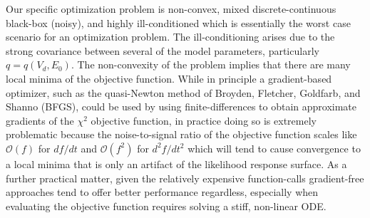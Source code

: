 \documentclass[12pt,a4paper,oneside]{book}
\begin{document}
Our specific optimization problem is non-convex, mixed discrete-continuous black-box (noisy), and highly ill-conditioned which is essentially the worst case scenario for an optimization problem. The ill-conditioning arises due to the strong covariance between several of the model parameters, particularly $q=q(V_d, E_0)$. The non-convexity of the problem implies that there are many local minima of the objective function. While in principle a gradient-based optimizer, such as the quasi-Newton method of Broyden, Fletcher, Goldfarb, and Shanno (BFGS)\cite{nocedal_numerical_2006}, could be used by using finite-differences to obtain approximate gradients of the $\chi^2$ objective function, in practice doing so is extremely problematic because the noise-to-signal ratio of the objective function scales like $\mathcal{O}(f)$ for $df/dt$ and $\mathcal{O}(f^2)$ for $d^2f/dt^2$ which will tend to cause convergence to a local minima that is only an artifact of the likelihood response surface\cite{wood_data_1982}. As a further practical matter, given the relatively expensive function-calls gradient-free approaches tend to offer better performance regardless\cite{kolda_optimization_2003}, especially when evaluating the objective function requires solving a stiff, non-linear ODE.   
\end{document}

